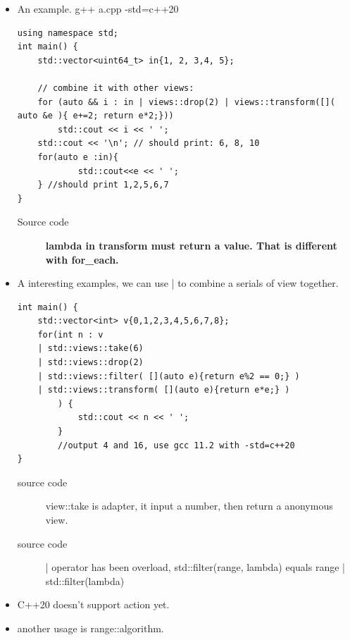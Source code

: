 \documentclass[a4paper,11pt,twoside]{book}
\begin{document}
\begin{itemize}
\begin{lstlisting}
std::drop_while_view, std::views::drop_while 
// skips the initial elements of another view until the predicate returns false
std::join_view, std::views::join             
// joins a view of ranges
std::split_view, std::views::split           
// splits a view by using a delimiter
std::common_view, std::views::common         
// converts a view into a std::common_range
std::reverse_view, std::views::reverse       
// iterates in reverse order
std::basic_istream_view, std::istream_view   
// applies operator>> on the view
std::elements_view, std::views::elements     
// creates a view on the N-th element of tuples
std::keys_view, std::views::keys             
// creates a view on the first element of a pair-like values
std::values_view, std::views::values         
// creates a view on the second elements of a pair-like values
\end{lstlisting}


\item An example. g++ a.cpp -std=c++20

\begin{lstlisting}
using namespace std;
int main() {
    std::vector<uint64_t> in{1, 2, 3,4, 5};

    // combine it with other views:
    for (auto && i : in | views::drop(2) | views::transform([]( auto &e ){ e+=2; return e*2;}))
        std::cout << i << ' ';
    std::cout << '\n'; // should print: 6, 8, 10
	for(auto e :in){
			std::cout<<e << ' ';
	} //should print 1,2,5,6,7
}
\end{lstlisting}
\begin{description}
		\item[Source code] \textbf{lambda in transform must return a value. That is different with for\_each.} 
\end{description}

	\item A interesting examples, we can use | to combine a serials of view together. 
\begin{lstlisting}
int main() {
	std::vector<int> v{0,1,2,3,4,5,6,7,8};
	for(int n : v   
	| std::views::take(6)
	| std::views::drop(2)
	| std::views::filter( [](auto e){return e%2 == 0;} )
	| std::views::transform( [](auto e){return e*e;} )
		) {
			std::cout << n << ' ';
		}
		//output 4 and 16, use gcc 11.2 with -std=c++20
}
\end{lstlisting}	

\begin{description}
	\item[source code] view::take is adapter, it input a number, then return a anonymous view.
	\item[source code] | operator has been overload, std::filter(range, lambda) equals range | std::filter(lambda)
\end{description}
	\item C++20 doesn't support action yet. 
	\item another usage is range::algorithm. 


\end{itemize}
\end{document}
